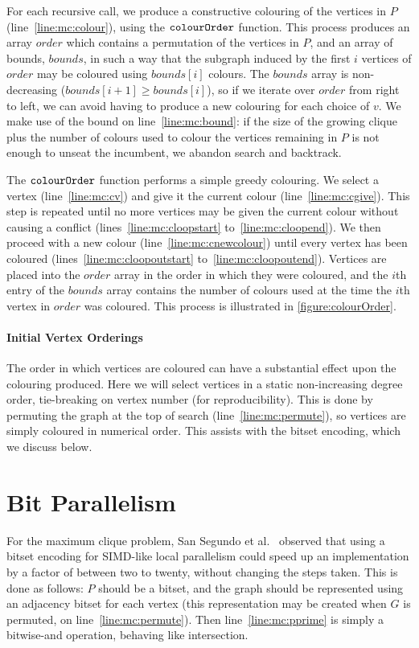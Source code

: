 \documentclass[a4paper]{article}
\newcommand{\bounds}{\mathit{bounds}}
\newcommand{\order}{\mathit{order}}
\newcommand{\colourOrder}{\FuncSty{colourOrder}}
\newcommand{\mcline}[1]{line~\ref{line:mc:#1}}
\newcommand{\mclinerange}[2]{lines~\ref{line:mc:#1} to~\ref{line:mc:#2}}
\begin{document}
For each recursive call, we produce a constructive colouring of the vertices in $P$
(\mcline{colour}), using the $\colourOrder$ function. This process produces an array $\order$ which
contains a permutation of the vertices in $P$, and an array of bounds, $\bounds$, in such a way that
the subgraph induced by the first $i$ vertices of $\order$ may be coloured using $\bounds[i]$
colours. The $\bounds$ array is non-decreasing ($\bounds[i + 1] \ge \bounds[i]$), so if we iterate
over $\order$ from right to left, we can avoid having to produce a new colouring for each choice of
$v$. We make use of the bound on \mcline{bound}: if the size of the growing clique plus the number
of colours used to colour the vertices remaining in $P$ is not enough to unseat the incumbent, we
abandon search and backtrack.

The $\colourOrder$ function performs a simple greedy colouring. We select a vertex (\mcline{cv}) and
give it the current colour (\mcline{cgive}). This step is repeated until no more vertices may be
given the current colour without causing a conflict (\mclinerange{cloopstart}{cloopend}). We then
proceed with a new colour (\mcline{cnewcolour}) until every vertex has been coloured
(\mclinerange{cloopoutstart}{cloopoutend}). Vertices are placed into the $\order$ array in the order
in which they were coloured, and the $i$th entry of the $\bounds$ array contains the number of
colours used at the time the $i$th vertex in $\order$ was coloured. This process is illustrated in
\vref{figure:colourOrder}.

\paragraph{Initial Vertex Orderings} The order in which vertices are coloured can have a substantial
effect upon the colouring produced.  Here we will select vertices in a static non-increasing degree
order, tie-breaking on vertex number (for reproducibility). This is done by permuting the graph at
the top of search (\mcline{permute}), so vertices are simply coloured in numerical order. This
assists with the bitset encoding, which we discuss below.

\section{Bit Parallelism}

For the maximum clique problem, San Segundo et al.\ \cite{SanSegundo:2011,SanSegundo:2013} observed
that using a bitset encoding for SIMD-like local parallelism could speed up an implementation by a
factor of between two to twenty, without changing the steps taken. This is done as follows: $P$
should be a bitset, and the graph should be represented using an adjacency bitset for each vertex
(this representation may be created when $G$ is permuted, on \mcline{permute}). Then \mcline{pprime}
is simply a bitwise-and operation, behaving like intersection.
\end{document}
